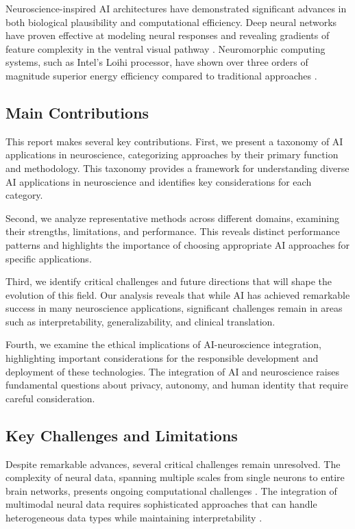 \documentclass[conference]{IEEEtran}
\begin{document}
Neuroscience-inspired AI architectures have demonstrated significant advances in both biological plausibility and computational efficiency. Deep neural networks have proven effective at modeling neural responses and revealing gradients of feature complexity in the ventral visual pathway \citep{gucluDeepNeuralNetworks2015}. Neuromorphic computing systems, such as Intel's Loihi processor, have shown over three orders of magnitude superior energy efficiency compared to traditional approaches \citep{daviesLoihiNeuromorphicManycore2018}.

\subsection{Main Contributions}

This report makes several key contributions. First, we present a taxonomy of AI applications in neuroscience, categorizing approaches by their primary function and methodology. This taxonomy provides a framework for understanding diverse AI applications in neuroscience and identifies key considerations for each category.

Second, we analyze representative methods across different domains, examining their strengths, limitations, and performance. This reveals distinct performance patterns and highlights the importance of choosing appropriate AI approaches for specific applications.

Third, we identify critical challenges and future directions that will shape the evolution of this field. Our analysis reveals that while AI has achieved remarkable success in many neuroscience applications, significant challenges remain in areas such as interpretability, generalizability, and clinical translation.

Fourth, we examine the ethical implications of AI-neuroscience integration, highlighting important considerations for the responsible development and deployment of these technologies. The integration of AI and neuroscience raises fundamental questions about privacy, autonomy, and human identity that require careful consideration.

\subsection{Key Challenges and Limitations}

Despite remarkable advances, several critical challenges remain unresolved. The complexity of neural data, spanning multiple scales from single neurons to entire brain networks, presents ongoing computational challenges \citep{onciulArtificialIntelligenceNeuroscience2025}. The integration of multimodal neural data requires sophisticated approaches that can handle heterogeneous data types while maintaining interpretability \citep{lorenziIntegrationMultimodalData2023}.
\end{document}

